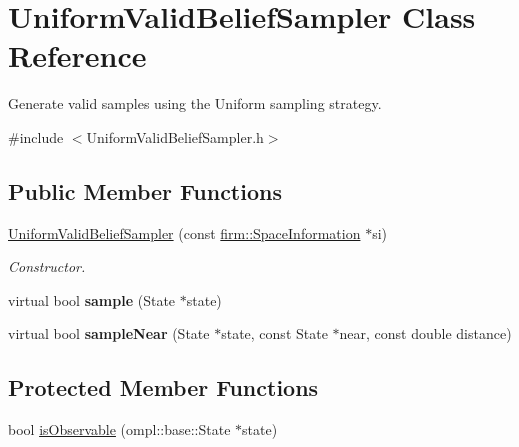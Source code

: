 \hypertarget{class_uniform_valid_belief_sampler}{\section{\-Uniform\-Valid\-Belief\-Sampler \-Class \-Reference}
\label{class_uniform_valid_belief_sampler}
}


\-Generate valid samples using the \-Uniform sampling strategy.  




{\ttfamily \#include $<$\-Uniform\-Valid\-Belief\-Sampler.\-h$>$}

\subsection*{\-Public \-Member \-Functions}
\begin{DoxyCompactItemize}
\item 
\hypertarget{class_uniform_valid_belief_sampler_a5c05246571e95d2a631679b57431232a}{\hyperlink{class_uniform_valid_belief_sampler_a5c05246571e95d2a631679b57431232a}{\-Uniform\-Valid\-Belief\-Sampler} (const \hyperlink{classfirm_1_1_space_information}{firm\-::\-Space\-Information} $\ast$si)}\label{class_uniform_valid_belief_sampler_a5c05246571e95d2a631679b57431232a}

\begin{DoxyCompactList}\small\item\em \-Constructor. \end{DoxyCompactList}\item 
\hypertarget{class_uniform_valid_belief_sampler_ad2cd6ccdd48289255ee92b919ce68982}{virtual bool {\bfseries sample} (\-State $\ast$state)}\label{class_uniform_valid_belief_sampler_ad2cd6ccdd48289255ee92b919ce68982}

\item 
\hypertarget{class_uniform_valid_belief_sampler_a59da95b1d779e781149e3b83919f5684}{virtual bool {\bfseries sample\-Near} (\-State $\ast$state, const \-State $\ast$near, const double distance)}\label{class_uniform_valid_belief_sampler_a59da95b1d779e781149e3b83919f5684}

\end{DoxyCompactItemize}
\subsection*{\-Protected \-Member \-Functions}
\begin{DoxyCompactItemize}
\item 
bool \hyperlink{class_uniform_valid_belief_sampler_acb6c744f26fe0c07b959d2329aed90eb}{is\-Observable} (ompl\-::base\-::\-State $\ast$state)
\end{DoxyCompactItemize}
